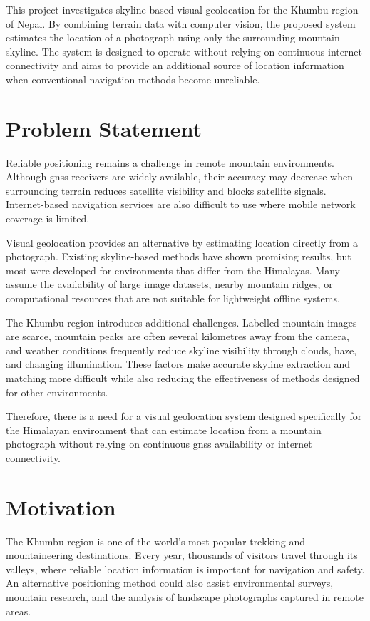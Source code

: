 This project investigates skyline-based visual geolocation for the Khumbu region of Nepal. By combining terrain data with computer vision, the proposed system estimates the location of a photograph using only the surrounding mountain skyline. The system is designed to operate without relying on continuous internet connectivity and aims to provide an additional source of location information when conventional navigation methods become unreliable.

\section{Problem Statement}

Reliable positioning remains a challenge in remote mountain environments. Although \Gls{gnss} receivers are widely available, their accuracy may decrease when surrounding terrain reduces satellite visibility and blocks satellite signals. Internet-based navigation services are also difficult to use where mobile network coverage is limited.

Visual geolocation provides an alternative by estimating location directly from a photograph. Existing skyline-based methods have shown promising results, but most were developed for environments that differ from the Himalayas. Many assume the availability of large image datasets, nearby mountain ridges, or computational resources that are not suitable for lightweight offline systems.

The Khumbu region introduces additional challenges. Labelled mountain images are scarce, mountain peaks are often several kilometres away from the camera, and weather conditions frequently reduce skyline visibility through clouds, haze, and changing illumination. These factors make accurate skyline extraction and matching more difficult while also reducing the effectiveness of methods designed for other environments.

Therefore, there is a need for a visual geolocation system designed specifically for the Himalayan environment that can estimate location from a mountain photograph without relying on continuous \Gls{gnss} availability or internet connectivity.

\section{Motivation}

The Khumbu region is one of the world's most popular trekking and mountaineering destinations. Every year, thousands of visitors travel through its valleys, where reliable location information is important for navigation and safety. An alternative positioning method could also assist environmental surveys, mountain research, and the analysis of landscape photographs captured in remote areas.

